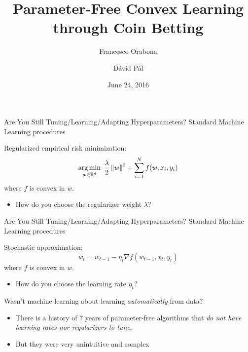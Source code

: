 \documentclass{beamer}
\title{Parameter-Free Convex Learning through Coin Betting}
\author{Francesco Orabona \and D\'avid P\'al}
\institute[] %
{
Yahoo Research, New York
}
\date[June 24, 2016]{June 24, 2016}
\newcommand{\grad}{\nabla}
\begin{document}
%
%
\begin{frame}{Are You Still Tuning/Learning/Adapting Hyperparameters?}
	Standard Machine Learning procedures
	
	\vspace{1cm}
	
	Regularized empirical risk minimization:
	\[
	\operatorname*{arg\,min}_{w \in \mathbb{R}^d} \ \frac{\lambda}{2} \left\|{w}\right\|^2 + \sum_{i=1}^N f(w, x_i, y_i)
	\]
	where $f$ is convex in $w$.
	\begin{itemize}
	\item<2> How do you choose the regularizer weight $\lambda$?
	\end{itemize}
\end{frame}
%
%
\begin{frame}{Are You Still Tuning/Learning/Adapting Hyperparameters?}
	Standard Machine Learning procedures
	
	\vspace{1cm}
	
	Stochastic approximation:
	\[
	w_t = w_{t-1} - \eta_t \grad f(w_{t-1}, x_t, y_t)
	\]
	where $f$ is convex in $w$.
	\begin{itemize}
	\item<2> How do you choose the learning rate $\eta_t$?
	\end{itemize}
\end{frame}
%
%
\begin{frame}{Wasn't machine learning about learning \emph{automatically} from data?}

\begin{itemize}
\item There is a history of 7 years of parameter-free algorithms that \emph{do not have learning rates nor regularizers to tune}.
\item But they were very unintuitive and complex
\end{itemize}
\end{frame}
%
%
\end{document}
